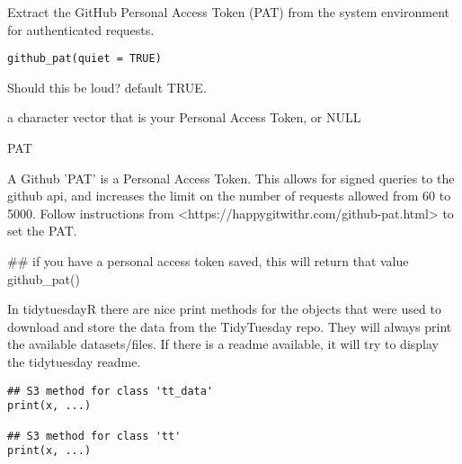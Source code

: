 \documentclass[letterpaper]{book}
\begin{document}
%
\begin{Description}\relax
Extract the GitHub Personal Access Token (PAT) from the system environment
for authenticated requests.
\end{Description}
%
\begin{Usage}
\begin{verbatim}
github_pat(quiet = TRUE)
\end{verbatim}
\end{Usage}
%
\begin{Arguments}
\begin{ldescription}
\item[\code{quiet}] Should this be loud? default TRUE.
\end{ldescription}
\end{Arguments}
%
\begin{Value}
a character vector that is your Personal Access Token, or NULL
\end{Value}
%
\begin{Section}{PAT}


A Github 'PAT' is a Personal Access Token. This allows for signed queries to
the github api, and increases the limit on the number of requests allowed
from 60 to 5000. Follow instructions from
<https://happygitwithr.com/github-pat.html> to set the PAT.
\end{Section}
%
\begin{Examples}
\begin{ExampleCode}

## if you have a personal access token saved, this will return that value
github_pat()

\end{ExampleCode}
\end{Examples}
%
\begin{Description}\relax
In tidytuesdayR there are nice print methods for the objects that were used
to download and store the data from the TidyTuesday repo. They will always
print the available datasets/files. If there is a readme available,
it will try to display the tidytuesday readme.
\end{Description}
%
\begin{Usage}
\begin{verbatim}
## S3 method for class 'tt_data'
print(x, ...)

## S3 method for class 'tt'
print(x, ...)
\end{verbatim}
\end{Usage}
\end{document}
